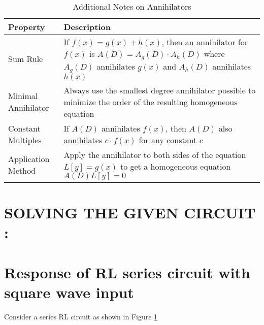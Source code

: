 \documentclass[journal]{IEEEtran}
\begin{document}
\begin{table}[htbp]
\centering
\caption{Additional Notes on Annihilators}
\begin{tabular}{|l|p{10cm}|}
\hline
\textbf{Property} & \textbf{Description} \\
\hline
Sum Rule & If $f(x) = g(x) + h(x)$, then an annihilator for $f(x)$ is $A(D) = A_g(D) \cdot A_h(D)$ where $A_g(D)$ annihilates $g(x)$ and $A_h(D)$ annihilates $h(x)$ \\
\hline
Minimal Annihilator & Always use the smallest degree annihilator possible to minimize the order of the resulting homogeneous equation \\
\hline
Constant Multiples & If $A(D)$ annihilates $f(x)$, then $A(D)$ also annihilates $c \cdot f(x)$ for any constant $c$ \\
\hline
Application Method & Apply the annihilator to both sides of the equation $L[y] = g(x)$ to get a homogeneous equation $A(D)L[y] = 0$ \\
\hline
\end{tabular}
\end{table}

\section{\textbf{SOLVING THE GIVEN CIRCUIT} : }
\section{Response of RL series circuit with square wave input}
Consider a series RL circuit as shown in Figure \ref{fig:rl}
\begin{figure}[!ht]
\centering
{}%
\label{fig:rl}
\end{figure}
\end{document}
